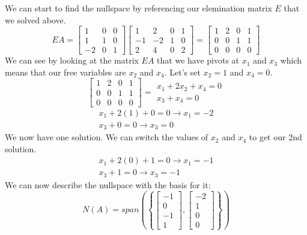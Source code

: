 \documentclass[]{exam}
\begin{document}
\begin{questions}
\begin{parts}
	\begin{solution}
		We can start to find the nullspace by referencing our elemination matrix $E$ that we solved above.
		\[
			EA = 
			\begin{bmatrix}
				1 & 0 & 0 \\
				1 & 1 & 0 \\
				-2 & 0 & 1
			\end{bmatrix}
			\begin{bmatrix}
				1 & 2 & 0 & 1 \\
				-1 & -2 & 1 & 0 \\
				2 & 4 & 0 & 2
			\end{bmatrix} =
			\begin{bmatrix}
				1 & 2 & 0 & 1 \\
				0 & 0 & 1 & 1 \\
				0 & 0 & 0 & 0
			\end{bmatrix}
		\]
		We can see by looking at the matrix $EA$ that we have pivots at $x_1$ and $x_3$ which means that our free variables are $x_2$ and $x_4$.  Let's set $x_2 = 1$ and $x_4 = 0$.
		\[
			\begin{bmatrix}
				1 & 2 & 0 & 1 \\
				0 & 0 & 1 & 1 \\
				0 & 0 & 0 & 0
			\end{bmatrix} =
			\begin{array}{r}
				x_1 + 2x_2 + x_4 = 0 \\
				x_3 + x_4 = 0
			\end{array}
		\]
		\[
			\begin{array}{c}
				x_1 + 2(1) + 0 = 0 \rightarrow x_1 = -2	\\
				x_3 + 0 = 0 \rightarrow x_3 = 0
			\end{array}
		\]
		We now have one solution. We can switch the values of $x_2$ and $x_4$ to get our 2nd solution.
		\[
			\begin{array}{c}
				x_1 + 2(0) + 1 = 0 \rightarrow x_1 = -1	\\
				x_3 + 1 = 0 \rightarrow x_3 = -1
			\end{array}
		\]
		We can now describe the nullspace with the basis for it:
		\[
			N(A) = span\left(\left\{
				\begin{bmatrix}
					-1 \\ 0 \\ -1 \\1
				\end{bmatrix},\begin{bmatrix}
					-2 \\ 1 \\ 0 \\ 0
			\end{bmatrix}
			\right\}\right)
		\]
	\end{solution}
	\newpage

\end{parts}
\end{questions}
\end{document}
